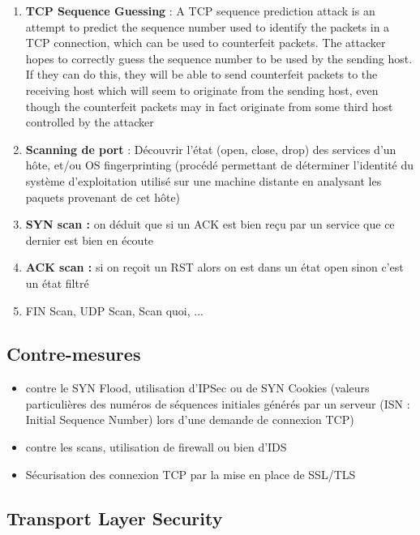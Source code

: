 \documentclass{report}
\begin{document}
\begin{enumerate}
    \item \textbf{TCP Sequence Guessing} : A TCP sequence prediction attack is an attempt to predict the sequence number used to identify the packets in a TCP connection, which can be used to counterfeit packets. The attacker hopes to correctly guess the sequence number to be used by the sending host. If they can do this, they will be able to send counterfeit packets to the receiving host which will seem to originate from the sending host, even though the counterfeit packets may in fact originate from some third host controlled by the attacker

    \item \textbf{Scanning de port} : Découvrir l'état (open, close, drop) des services d'un hôte, et/ou OS fingerprinting (procédé permettant de déterminer l'identité du système d'exploitation utilisé sur une machine distante en analysant les paquets provenant de cet hôte)

    \item \textbf{SYN scan :} on déduit que si un ACK est bien reçu par un service que ce dernier est bien en écoute

    \item \textbf{ACK scan :} si on reçoit un RST alors on est dans un état open sinon c'est un état filtré

    \item FIN Scan, UDP Scan, Scan quoi, ...
\end{enumerate}

\subsection{Contre-mesures}

\begin{itemize}
    \item contre le SYN Flood, utilisation d'IPSec ou de SYN Cookies (valeurs particulières des numéros de séquences initiales générés par un serveur (ISN : Initial Sequence Number) lors d'une demande de connexion TCP)

    \item contre les scans, utilisation de firewall ou bien d'IDS
    \item Sécurisation des connexion TCP par la mise en place de SSL/TLS
\end{itemize}

\subsection{Transport Layer Security}
\end{document}
